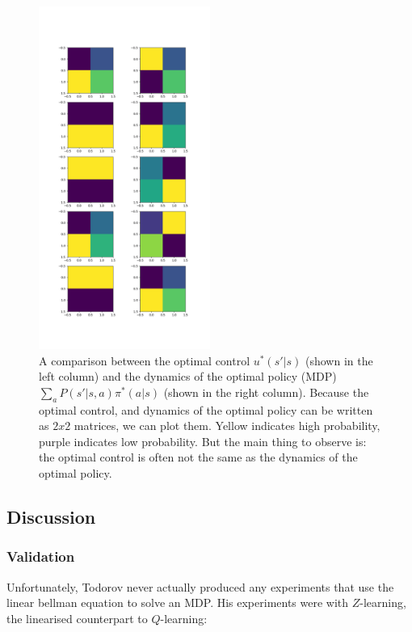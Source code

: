 \begin{figure}
\centering
\includegraphics[width=0.5\textwidth,height=0.75\textheight]{../../pictures/figures/lmdp_mdp_optimal_dynamics.png}
\caption{A comparison between the optimal control $u^{* }(s'|s)$ (shown in the left column) and the dynamics of the optimal policy (MDP) $\sum_a P(s'|s, a)\pi^{* }(a|s)$ (shown in the right column). Because the optimal control, and dynamics of the optimal policy can be written as $2x2$ matrices, we can plot them. Yellow indicates high probability, purple indicates low probability. But the main thing to observe is: the optimal control is often not the same as the dynamics of the optimal policy.}
\end{figure}

\subsection{Discussion}

\subsubsection{Validation} \label{lmdp-validation}

Unfortunately, Todorov \cite{Todorov2006,Todorov2009} never actually produced
any experiments that use the linear bellman equation to solve an MDP.
His experiments were with $Z$-learning, the linearised counterpart to $Q$-learning:

